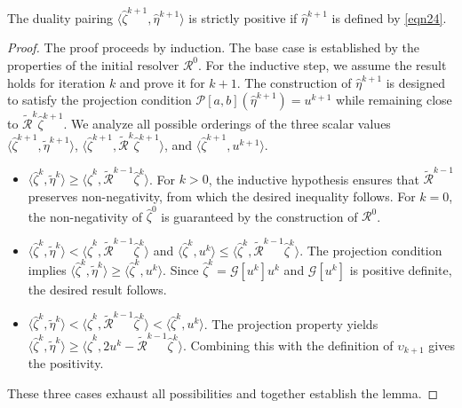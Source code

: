\documentclass[onefignum,onetabnum]{siamart190516}
\numberwithin{equation}{section}
\begin{document}
\begin{lemma}\label{lemma3}
The duality pairing $\langle \hat{\zeta}^{k+1}, \hat{\eta}^{k+1} \rangle$ is strictly positive if $\hat{\eta}^{k+1}$ is defined by \eqref{eqn24}.
\end{lemma}
\begin{proof}
The proof proceeds by induction.
The base case is established by the properties of the initial resolver $\mathcal{R}^0$.
For the inductive step, we assume the result holds for iteration $k$ and prove it for $k+1$.
The construction of $\hat{\eta}^{k+1}$ is designed to satisfy the projection condition $\mathcal{P}{[a,b]}(\hat{\eta}^{k+1}) = u^{k+1}$ while remaining close to $\widetilde{\mathcal{R}}^{k}\hat{\zeta}^{k+1}$.
We analyze all possible orderings of the three scalar values $\langle \hat{\zeta}^{k+1}, \tilde{\eta}^{k+1} \rangle$, $\langle \hat{\zeta}^{k+1}, \widetilde{\mathcal{R}}^{k}\hat{\zeta}^{k+1} \rangle$, and $\langle \hat{\zeta}^{k+1}, u^{k+1} \rangle$.
\begin{itemize}
\item[(a)] $\langle \hat{\zeta}^k, \tilde{\eta}^k \rangle \geq \langle \hat{\zeta}^k, \widetilde{\mathcal{R}}^{k-1} \hat{\zeta}^{k} \rangle$.
For $k > 0$, the inductive hypothesis ensures that $\widetilde{\mathcal{R}}^{k-1}$ preserves non-negativity, from which the desired inequality follows.
For $k = 0$, the non-negativity of $\hat{\zeta}^0$ is guaranteed by the construction of $\mathcal{R}^0$.
\item[(b)]
$\langle \hat{\zeta}^k, \tilde{\eta}^k \rangle < \langle \hat{\zeta}^k, \widetilde{\mathcal{R}}^{k-1} \hat{\zeta}^{k} \rangle$ and $\langle \hat{\zeta}^k, u^k \rangle \leq \langle \hat{\zeta}^k, \widetilde{\mathcal{R}}^{k-1} \hat{\zeta}^{k} \rangle$.
The projection condition implies $\langle \hat{\zeta}^k, \tilde{\eta}^k \rangle \geq \langle \hat{\zeta}^k, u^k \rangle$.
Since $\hat{\zeta}^k = \mathcal{G}[u^k]u^k$ and $\mathcal{G}[u^k]$ is positive definite, the desired result follows.
\item[(c)]
$\langle \hat{\zeta}^k, \tilde{\eta}^k \rangle < \langle \hat{\zeta}^k, \widetilde{\mathcal{R}}^{k-1} \hat{\zeta}^{k} \rangle < \langle \hat{\zeta}^k, u^k \rangle$.  
The projection property yields $\langle \hat{\zeta}^k, \tilde{\eta}^k \rangle \geq \langle \hat{\zeta}^k, 2u^k - \widetilde{\mathcal{R}}^{k-1} \hat{\zeta}^{k} \rangle$.
Combining this with the definition of $\upsilon_{k+1}$ gives the positivity.
\end{itemize}
These three cases exhaust all possibilities and together establish the lemma.
\end{proof}
\end{document}
